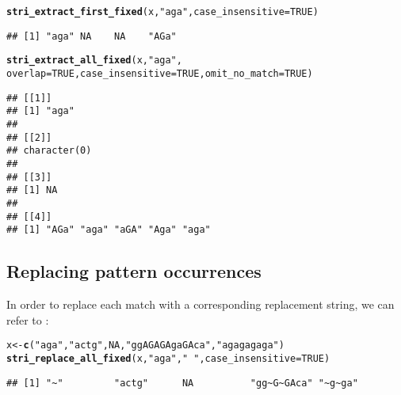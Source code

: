 \documentclass[nojss]{jss}\usepackage[]{graphicx}\usepackage[]{xcolor}
\makeatletter
\newcommand{\hlnum}[1]{\textcolor[rgb]{0.686,0.059,0.569}{#1}}%
\newcommand{\hlstr}[1]{\textcolor[rgb]{0.192,0.494,0.8}{#1}}%
\newcommand{\hlstd}[1]{\textcolor[rgb]{0.345,0.345,0.345}{#1}}%
\newcommand{\hlkwb}[1]{\textcolor[rgb]{0.69,0.353,0.396}{#1}}%
\newcommand{\hlkwc}[1]{\textcolor[rgb]{0.333,0.667,0.333}{#1}}%
\newcommand{\hlkwd}[1]{\textcolor[rgb]{0.737,0.353,0.396}{\textbf{#1}}}%
\newenvironment{kframe}{%
 \def\at@end@of@kframe{}%
 \ifinner\ifhmode%
  \def\at@end@of@kframe{\end{minipage}}%
  \begin{minipage}{\columnwidth}%
 \fi\fi%
 \def\FrameCommand##1{\hskip\@totalleftmargin \hskip-\fboxsep
 \colorbox{shadecolor}{##1}\hskip-\fboxsep
     \hskip-\linewidth \hskip-\@totalleftmargin \hskip\columnwidth}%
 \MakeFramed {\advance\hsize-\width
   \@totalleftmargin\z@ \linewidth\hsize
   \@setminipage}}%
 {\par\unskip\endMakeFramed%
 \at@end@of@kframe}
\newenvironment{knitrout}{}{} %
\makeatother
\begin{document}
\begin{knitrout}
\color{fgcolor}\begin{kframe}
\begin{alltt}
\hlkwd{stri_extract_first_fixed}\hlstd{(x,} \hlstr{"aga"}\hlstd{,} \hlkwc{case_insensitive}\hlstd{=}\hlnum{TRUE}\hlstd{)}
\end{alltt}
\begin{verbatim}
## [1] "aga" NA    NA    "AGa"
\end{verbatim}
\begin{alltt}
\hlkwd{stri_extract_all_fixed}\hlstd{(x,} \hlstr{"aga"}\hlstd{,}
  \hlkwc{overlap}\hlstd{=}\hlnum{TRUE}\hlstd{,} \hlkwc{case_insensitive}\hlstd{=}\hlnum{TRUE}\hlstd{,} \hlkwc{omit_no_match}\hlstd{=}\hlnum{TRUE}\hlstd{)}
\end{alltt}
\begin{verbatim}
## [[1]]
## [1] "aga"
## 
## [[2]]
## character(0)
## 
## [[3]]
## [1] NA
## 
## [[4]]
## [1] "AGa" "aga" "aGA" "Aga" "aga"
\end{verbatim}
\end{kframe}
\end{knitrout}






\subsection{Replacing pattern occurrences}

In order to replace each match with a corresponding
replacement string, we can refer to :

\begin{knitrout}
\color{fgcolor}\begin{kframe}
\begin{alltt}
\hlstd{x} \hlkwb{<-} \hlkwd{c}\hlstd{(}\hlstr{"aga"}\hlstd{,} \hlstr{"actg"}\hlstd{,} \hlnum{NA}\hlstd{,} \hlstr{"ggAGAGAgaGAca"}\hlstd{,} \hlstr{"agagagaga"}\hlstd{)}
\hlkwd{stri_replace_all_fixed}\hlstd{(x,} \hlstr{"aga"}\hlstd{,} \hlstr{"~"}\hlstd{,} \hlkwc{case_insensitive}\hlstd{=}\hlnum{TRUE}\hlstd{)}
\end{alltt}
\begin{verbatim}
## [1] "~"         "actg"      NA          "gg~G~GAca" "~g~ga"
\end{verbatim}
\end{kframe}
\end{knitrout}
\end{document}
